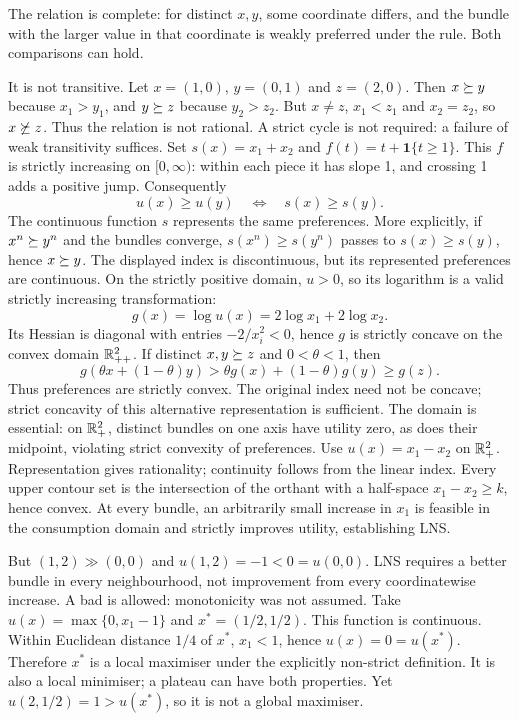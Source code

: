 The relation is complete: for distinct $x,y$, some coordinate differs, and the bundle with the larger value in that coordinate is weakly preferred under the rule. Both comparisons can hold.

It is not transitive. Let $x=(1,0)$, $y=(0,1)$ and $z=(2,0)$. Then $x\succeq y$ because $x_1>y_1$, and $y\succeq z$ because $y_2>z_2$. But $x\ne z$, $x_1<z_1$ and $x_2=z_2$, so $x\not\succeq z$. Thus the relation is not rational. A strict cycle is not required: a failure of weak transitivity suffices.
Set $s(x)=x_1+x_2$ and $f(t)=t+\mathbf1\{t\ge1\}$. This $f$ is strictly increasing on $[0,\infty)$: within each piece it has slope 1, and crossing 1 adds a positive jump. Consequently
\[
 u(x)\ge u(y)\quad\Longleftrightarrow\quad s(x)\ge s(y).
\]
The continuous function $s$ represents the same preferences. More explicitly, if $x^n\succeq y^n$ and the bundles converge, $s(x^n)\ge s(y^n)$ passes to $s(x)\ge s(y)$, hence $x\succeq y$. The displayed index is discontinuous, but its represented preferences are continuous.
On the strictly positive domain, $u>0$, so its logarithm is a valid strictly increasing transformation:
\[
 g(x)=\log u(x)=2\log x_1+2\log x_2.
\]
Its Hessian is diagonal with entries $-2/x_i^2<0$, hence $g$ is strictly concave on the convex domain $\mathbb R_{++}^2$. If distinct $x,y\succeq z$ and $0<\theta<1$, then
\[
 g(\theta x+(1-\theta)y)>\theta g(x)+(1-\theta)g(y)\ge g(z).
\]
Thus preferences are strictly convex. The original index need not be concave; strict concavity of this alternative representation is sufficient. The domain is essential: on $\mathbb R_+^2$, distinct bundles on one axis have utility zero, as does their midpoint, violating strict convexity of preferences.
\clearpage
{}
Use $u(x)=x_1-x_2$ on $\mathbb R_+^2$. Representation gives rationality; continuity follows from the linear index. Every upper contour set is the intersection of the orthant with a half-space $x_1-x_2\ge k$, hence convex. At every bundle, an arbitrarily small increase in $x_1$ is feasible in the consumption domain and strictly improves utility, establishing LNS.

But $(1,2)\gg(0,0)$ and $u(1,2)=-1<0=u(0,0)$. LNS requires a better bundle in every neighbourhood, not improvement from every coordinatewise increase. A bad is allowed: monotonicity was not assumed.
Take $u(x)=\max\{0,x_1-1\}$ and $x^*=(1/2,1/2)$. This function is continuous. Within Euclidean distance $1/4$ of $x^*$, $x_1<1$, hence $u(x)=0=u(x^*)$. Therefore $x^*$ is a local maximiser under the explicitly non-strict definition. It is also a local minimiser; a plateau can have both properties. Yet $u(2,1/2)=1>u(x^*)$, so it is not a global maximiser.

